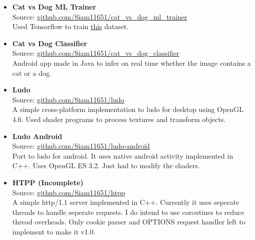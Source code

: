 \begin{itemize}
{  }
  \item {
      \textbf{Cat vs Dog ML Trainer} \\
      Source: \href{https://github.com/Siam11651/cat_vs_dog_ml_trainer}{github.com/Siam11651/cat\_vs\_dog\_ml\_trainer} \\
      Used Tensorflow to train \href{https://www.kaggle.com/competitions/dogs-vs-cats}{this} dataset.
    }
  \item {
    \textbf{Cat vs Dog Classifier} \\
    Source: \href{https://github.com/Siam11651/cat_vs_dog_classifier}{github.com/Siam11651/cat\_vs\_dog\_classifier} \\
    Android app made in Java to infer on real time whether the image contains a cat or a dog.
  }
  \item {
    \textbf{Ludo} \\
    Source: \href{https://github.com/Siam11651/ludo}{github.com/Siam11651/ludo} \\
    A simple cross-platform implementation to ludo for desktop using OpenGL 4.6. Used shader programs to process textures and transform objects.
  }
  \item {
    \textbf{Ludo Android} \\
    Source: \href{https://github.com/Siam11651/ludo-android}{github.com/Siam11651/ludo-android} \\
    Port to ludo for android. It uses native android activity implemented in C++. Uses OpenGL ES 3.2. Just had to modify the shaders.
  }
  \item {
    \textbf{HTPP (Incomplete)} \\
    Source: \href{https://github.com/Siam11651/htpp}{github.com/Siam11651/htpp} \\
    A simple http/1.1 server implemented in C++. Currently it uses seperate threads to handle seperate requests. I do intend to use coroutines to reduce thread overheads. Only cookie parser and OPTIONS request handler left to implement to make it v1.0.
  }
\end{itemize}